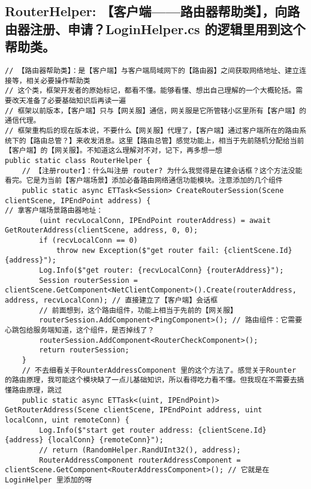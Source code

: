 \documentclass[9pt, b5paper]{article}
\begin{document}
\subsection{RouterHelper: 【客户端——路由器帮助类】，向路由器注册、申请？LoginHelper.cs 的逻辑里用到这个帮助类。}
\label{sec-7-5}
\begin{verbatim}
// 【路由器帮助类】：是【客户端】与客户端局域网下的【路由器】之间获取网络地址、建立连接等，相关必要操作帮助类
// 这个类，框架开发者的原始标记，都看不懂。能够看懂、想出自己理解的一个大概轮括。需要改天准备了必要基础知识后再读一遍
// 框架以前版本，【客户端】只与【网关服】通信，网关服是它所管辖小区里所有【客户端】的通信代理。
// 框架重构后的现在版本说，不要什么【网关服】代理了，【客户端】通过客户端所在的路由系统下的【路由总管？】来收发消息。这里【路由总管】感觉功能上，相当于先前随机分配给当前【客户端】的【网关服】。不知道这么理解对不对，记下，再多想一想
public static class RouterHelper {
    // 【注册router】：什么叫注册 router? 为什么我觉得是在建会话框？这个方法没能看完。它是为当前【客户端场景】添加必备路由网络通信功能模块。注意添加的几个组件
    public static async ETTask<Session> CreateRouterSession(Scene clientScene, IPEndPoint address) {
// 拿客户端场景路由器地址：
        (uint recvLocalConn, IPEndPoint routerAddress) = await GetRouterAddress(clientScene, address, 0, 0); 
        if (recvLocalConn == 0) 
            throw new Exception($"get router fail: {clientScene.Id} {address}");
        Log.Info($"get router: {recvLocalConn} {routerAddress}");
        Session routerSession = clientScene.GetComponent<NetClientComponent>().Create(routerAddress, address, recvLocalConn); // 直接建立了【客户端】会话框
        // 前面想到，这个路由组件，功能上相当于先前的【网关服】
        routerSession.AddComponent<PingComponent>(); // 路由组件：它需要心跳包给服务端知道，这个组件，是否掉线了？
        routerSession.AddComponent<RouterCheckComponent>(); 
        return routerSession;
    }
    // 不去细看关于RounterAddressComponent 里的这个方法了。感觉关于Rounter 的路由原理，我可能这个模块缺了一点儿基础知识，所以看得吃力看不懂。但我现在不需要去搞懂路由原理，跳过
    public static async ETTask<(uint, IPEndPoint)> GetRouterAddress(Scene clientScene, IPEndPoint address, uint localConn, uint remoteConn) {
        Log.Info($"start get router address: {clientScene.Id} {address} {localConn} {remoteConn}");
        // return (RandomHelper.RandUInt32(), address);
        RouterAddressComponent routerAddressComponent = clientScene.GetComponent<RouterAddressComponent>(); // 它就是在 LoginHelper 里添加的呀

\end{verbatim}
\end{document}
